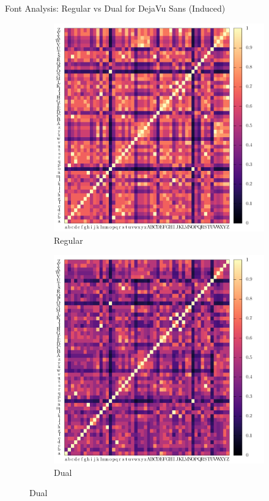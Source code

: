 \documentclass[10pt]{beamer}
\begin{document}
\begin{frame}{Font Analysis: Regular vs Dual for DejaVu Sans (Induced)}
	\begin{figure}
		\centering
		\begin{subfigure}[b]{0.4\linewidth}
			\includegraphics[width=\linewidth, height=0.9\linewidth]{../tables/dejavu-sans/induced-conf-nrm.pdf}
			\caption{
				Regular
			}
		\end{subfigure}
		\begin{subfigure}[b]{0.4\linewidth}
			\includegraphics[width=\linewidth, height=0.9\linewidth]{../tables/dual-dejavu-sans/induced-conf-nrm.pdf}
			\caption{
				Dual
			}
		\end{subfigure}
	\end{figure}
	

\end{frame}
\end{document}
